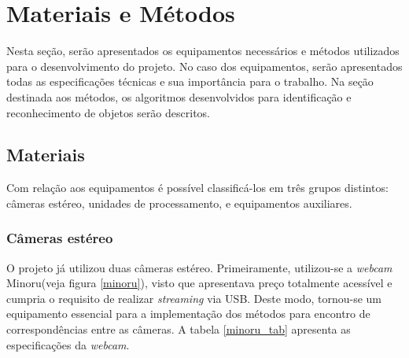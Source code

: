 \chapter{Materiais e Métodos}
\label{Materiais}


Nesta seção, serão apresentados os equipamentos necessários e métodos utilizados para o desenvolvimento do projeto. No caso dos equipamentos, serão apresentados todas as especificações técnicas e sua importância para o trabalho. Na seção destinada aos métodos, os algoritmos desenvolvidos para identificação e reconhecimento de objetos serão descritos.


\section{Materiais}

Com relação aos equipamentos é possível classificá-los em três grupos distintos: câmeras estéreo, unidades de processamento, e equipamentos auxiliares.


\subsection{Câmeras estéreo}

O projeto já utilizou duas câmeras estéreo. Primeiramente, utilizou-se a \textit{webcam} Minoru(veja figura \ref{minoru}), visto que apresentava preço totalmente acessível e cumpria o requisito de realizar \textit{streaming} via USB. Deste modo, tornou-se um equipamento essencial para a implementação dos métodos para encontro de correspondências entre as câmeras. A tabela \ref{minoru_tab}	 apresenta as especificações da \textit{webcam}.

